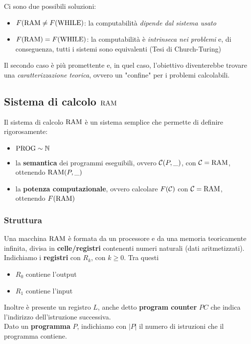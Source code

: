Ci sono due possibili soluzioni: 
\begin{itemize}
	\item $F(\text{RAM} \neq F(\text{WHILE})$: la computabilità \textit{dipende dal sistema usato}
	\item $F(\text{RAM}) = F(\text{WHILE})$: la computabilità è \textit{intrinseca nei problemi} e, di conseguenza, tutti i sistemi sono equivalenti (Tesi di Church-Turing)
\end{itemize}

Il secondo caso è più promettente e, in quel caso, l'obiettivo diventerebbe trovare una \textit{caratterizzazione teorica}, ovvero un "confine" per i problemi calcolabili.\\

\subsection{Sistema di calcolo $\text{RAM}$}
Il sistema di calcolo $\text{RAM}$ è un sistema semplice che permette di definire rigorosamente: 
\begin{itemize}
	\item $\text{PROG} \sim \mathbb{N}$
	\item la \textbf{semantica} dei programmi eseguibili, ovvero $\mathcal{C}(P,\_)$, con $\mathcal{C} = \text{RAM}$, ottenendo $\text{RAM} (P,\_)$
	\item la \textbf{potenza computazionale}, ovvero calcolare $F(\mathcal{C})$ con $\mathcal{C} = \text{RAM}$, ottenendo $F(\text{RAM})$
\end{itemize}

\subsubsection{Struttura}
Una macchina $\text{RAM}$ è formata da un processore e da una memoria teoricamente infinita, divisa in \textbf{celle/registri} contenenti numeri naturali (dati aritmetizzati).\\

Indichiamo i \textbf{registri} con $R_k$, con $k \geq 0$. Tra questi 
\begin{itemize}
	\item $R_0$ contiene l'output
	\item $R_1$ contiene l'input
\end{itemize}

Inoltre è presente un registro $L$, anche detto \textbf{program counter} $PC$ che indica l'indirizzo dell'istruzione successiva.\\

Dato un \textbf{programma} $P$, indichiamo con $|P|$ il numero di istruzioni che il programma contiene.\\

